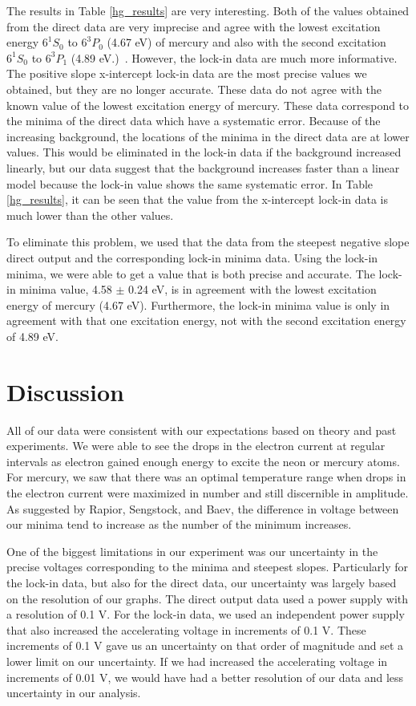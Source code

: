 \documentclass[prb,preprint]{revtex4-1}
\begin{document}
The results in Table \ref{hg_results} are very interesting. Both of the values obtained from the direct data are very imprecise and agree with the lowest excitation energy $6^{1}S_{0}$ to $6^{3}P_{0}$ (4.67 eV) of mercury and also with the second excitation $6^{1}S_{0}$ to $6^{3}P_{1}$ (4.89 eV.)~\cite{newfeatures}. However, the lock-in data are much more informative. The positive slope x-intercept lock-in data are the most precise values we obtained, but they are no longer accurate. These data do not agree with the known value of the lowest excitation energy of mercury. These data correspond to the minima of the direct data which have a systematic error. Because of the increasing background, the locations of the minima in the direct data are at lower values. This would be eliminated in the lock-in data if the background increased linearly, but our data suggest that the background increases faster than a linear model because the lock-in value shows the same systematic error. In Table \ref{hg_results}, it can be seen that the value from the x-intercept lock-in data is much lower than the other values.

To eliminate this problem, we used that the data from the steepest negative slope direct output and the corresponding lock-in minima data. Using the lock-in minima, we were able to get a value that is both precise and accurate. The lock-in minima value, 4.58 $\pm$ 0.24 eV, is in agreement with the lowest excitation energy of mercury (4.67 eV). Furthermore, the lock-in minima value is only in agreement with that one excitation energy, not with the second excitation energy of 4.89 eV. 



\section{Discussion}

All of our data were consistent with our expectations based on theory and past experiments. We were able to see the drops in the electron current at regular intervals as electron gained enough energy to excite the neon or mercury atoms. For mercury, we saw that there was an optimal temperature range when drops in the electron current were maximized in number and still discernible in amplitude. As suggested by Rapior,  Sengstock, and Baev, the difference in voltage between our minima tend to increase as the number of the minimum increases.

One of the biggest limitations in our experiment was our uncertainty in the precise voltages corresponding to the minima and steepest slopes. Particularly for the lock-in data, but also for the direct data, our uncertainty was largely based on the resolution of our graphs. The direct output data used a power supply with a resolution of 0.1 V. For the lock-in data, we used an independent power supply that also increased the accelerating voltage in increments of 0.1 V. These increments of 0.1 V gave us an uncertainty on that order of magnitude and set a lower limit on our uncertainty. If we had increased the accelerating voltage in increments of 0.01 V, we would have had a better resolution of our data and less uncertainty in our analysis. 
\end{document}
